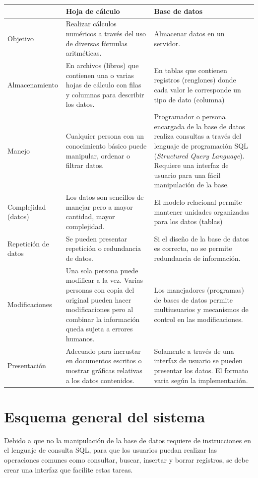 \documentclass[10pt,letterpaper]{article}
\begin{document}
\begin{center}
	\begin{tabular}{| l | p{5cm} | p{5cm} |}
		\hline
		 & Hoja de cálculo & Base de datos \\ \hline
		 
		 Objetivo 
		 	& Realizar cálculos numéricos a través del uso de diversas fórmulas aritméticas. 
		 	& Almacenar datos en un servidor. \\
		 \hline
		 Almacenamiento
		 	& En archivos (libros) que contienen una o varias hojas de cálculo con filas y columnas para describir los datos.
		 	& En tablas que contienen registros (renglones) donde cada valor le corresponde un tipo de dato (columna)\\
		 \hline
		 Manejo
		 	& Cualquier persona con un conocimiento básico puede manipular, ordenar o filtrar datos.
		 	& Programador o persona encargada de la base de datos realiza consultas a través del lenguaje de programación SQL (\textit{Structured Query Language}). Requiere una interfaz de usuario para una fácil manipulación de la base. \\
		 \hline
		 Complejidad (datos)
		 	& Los datos son sencillos de manejar pero a mayor cantidad, mayor complejidad.
		 	& El modelo relacional permite mantener unidades organizadas para los datos (tablas) \\
		 	\hline
		 Repetición de datos
		 	& Se pueden presentar repetición o redundancia de datos.
		 	& Si el diseño de la base de datos es correcta, no se permite redundancia de información. \\
		 	\hline
		 Modificaciones
		 	& Una sola persona puede modificar a la vez. Varias personas con copia del original pueden hacer modificaciones pero al combinar la información queda sujeta a errores humanos.
		 	& Los manejadores (programas) de bases de datos permite multiusuarios y mecanismos de control en las modificaciones. \\
		 	\hline
		 Presentación
		 	& Adecuado para incrustar en documentos escritos o mostrar gráficas relativas a los datos contenidos.
		 	& Solamente a través de una interfaz de usuario se pueden presentar los datos. El formato varia según la implementación. \\
		 	\hline
	\end{tabular}
\end{center}

\section{Esquema general del sistema}
Debido a que no la manipulación de la base de datos requiere de instrucciones en el lenguaje de consulta SQL, para que los usuarios puedan realizar las operaciones comunes como consultar, buscar, insertar y borrar registros, se debe crear una interfaz que facilite estas tareas.
\end{document}
